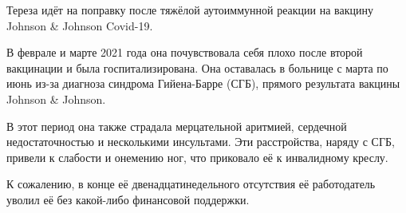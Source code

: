 Тереза идёт на поправку после тяжёлой аутоиммунной реакции на вакцину Johnson \&
Johnson Covid-19.

В феврале и марте 2021 года она почувствовала себя плохо после второй вакцинации
и была госпитализирована. Она оставалась в больнице с марта по июнь из-за
диагноза синдрома Гийена-Барре (СГБ), прямого результата вакцины Johnson \&
Johnson.

В этот период она также страдала мерцательной аритмией, сердечной
недостаточностью и несколькими инсультами. Эти расстройства, наряду с СГБ,
привели к слабости и онемению ног, что приковало её к инвалидному креслу.

К сожалению, в конце её двенадцатинедельного отсутствия её работодатель уволил
её без какой-либо финансовой поддержки.
